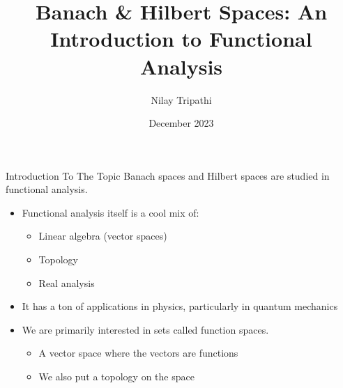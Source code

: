 \documentclass[10pt]{beamer}
\title[Banach \& Hilbert Spaces; Functional Analysis]{Banach \& Hilbert Spaces: An Introduction to Functional Analysis}
\subtitle{}
\author{Nilay Tripathi}
\date{December 2023}
\begin{document}
    \maketitle

    \begin{frame}{Introduction To The Topic}
				Banach spaces and Hilbert spaces are studied in \alert{functional analysis}.
        \begin{itemize}
            \item Functional analysis itself is a cool mix of: 
            \begin{itemize}
                \item Linear algebra (vector spaces)
                \item Topology 
                \item Real analysis
            \end{itemize}
            \item It has a ton of applications in physics, particularly in quantum mechanics
            \item We are primarily interested in sets called \alert{function spaces}. 
            \begin{itemize}
                \item A vector space where the vectors are functions 
                \item We also put a topology on the space
            \end{itemize}
        \end{itemize}
    \end{frame}
\end{document}
